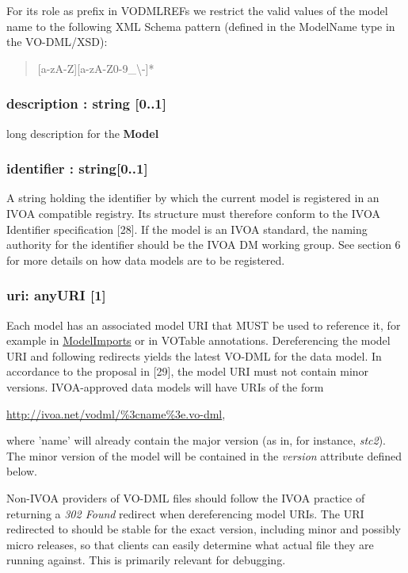 \documentclass[10pt,a4paper]{ivoa}
\begin{document}
For its role as prefix in VODMLREFs we restrict the valid values of the
model name to the following XML Schema pattern (defined in the ModelName
type in the VO-DML/XSD):

\begin{quote}
{[}a-zA-Z{]}{[}a-zA-Z0-9\_\textbackslash-{]}*
\end{quote}

\hypertarget{description-string-0..1-1}{%
\subsubsection{description : string
{[}0..1{]}}\label{description-string-0..1-1}}

long description for the \textbf{Model}

\hypertarget{identifier-string0..1}{%
\subsubsection{identifier :
string{[}0..1{]}}\label{identifier-string0..1}}

A string holding the identifier by which the current model is registered
in an IVOA compatible registry. Its structure must therefore conform to
the IVOA Identifier specification {[}28{]}. If the model is an IVOA
standard, the naming authority for the identifier should be the IVOA DM
working group. See section 6 for more details on how data models are to
be registered.

\hypertarget{uri-anyuri-1}{%
\subsubsection{uri: anyURI {[}1{]}}\label{uri-anyuri-1}}

Each model has an associated model URI that MUST be used to reference
it, for example in \protect\hyperlink{modelimport}{ModelImports} or in
VOTable annotations. Dereferencing the model URI and following redirects
yields the latest VO-DML for the data model. In accordance to the
proposal in {[}29{]}, the model URI must not contain minor versions.
IVOA-approved data models will have URIs of the form

\url{http://ivoa.net/vodml/\%3cname\%3e.vo-dml},

where 'name' will already contain the major version (as in, for
instance, \emph{stc2}). The minor version of the model will be contained
in the \emph{version} attribute defined below.

Non-IVOA providers of VO-DML files should follow the IVOA practice of
returning a \emph{302 Found} redirect when dereferencing model URIs. The
URI redirected to should be stable for the exact version, including
minor and possibly micro releases, so that clients can easily determine
what actual file they are running against. This is primarily relevant
for debugging.
\end{document}
